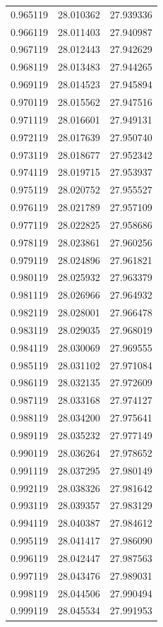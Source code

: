 \begin{tabular}{rrr}
0.965119 & 28.010362 & 27.939336 \\
0.966119 & 28.011403 & 27.940987 \\
0.967119 & 28.012443 & 27.942629 \\
0.968119 & 28.013483 & 27.944265 \\
0.969119 & 28.014523 & 27.945894 \\
0.970119 & 28.015562 & 27.947516 \\
0.971119 & 28.016601 & 27.949131 \\
0.972119 & 28.017639 & 27.950740 \\
0.973119 & 28.018677 & 27.952342 \\
0.974119 & 28.019715 & 27.953937 \\
0.975119 & 28.020752 & 27.955527 \\
0.976119 & 28.021789 & 27.957109 \\
0.977119 & 28.022825 & 27.958686 \\
0.978119 & 28.023861 & 27.960256 \\
0.979119 & 28.024896 & 27.961821 \\
0.980119 & 28.025932 & 27.963379 \\
0.981119 & 28.026966 & 27.964932 \\
0.982119 & 28.028001 & 27.966478 \\
0.983119 & 28.029035 & 27.968019 \\
0.984119 & 28.030069 & 27.969555 \\
0.985119 & 28.031102 & 27.971084 \\
0.986119 & 28.032135 & 27.972609 \\
0.987119 & 28.033168 & 27.974127 \\
0.988119 & 28.034200 & 27.975641 \\
0.989119 & 28.035232 & 27.977149 \\
0.990119 & 28.036264 & 27.978652 \\
0.991119 & 28.037295 & 27.980149 \\
0.992119 & 28.038326 & 27.981642 \\
0.993119 & 28.039357 & 27.983129 \\
0.994119 & 28.040387 & 27.984612 \\
0.995119 & 28.041417 & 27.986090 \\
0.996119 & 28.042447 & 27.987563 \\
0.997119 & 28.043476 & 27.989031 \\
0.998119 & 28.044506 & 27.990494 \\
0.999119 & 28.045534 & 27.991953 \\

\end{tabular}

